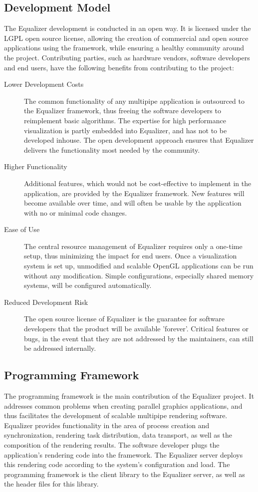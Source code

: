 \documentclass[10pt,a4paper]{scrartcl}
\begin{document}
\subsection{Development Model}

The Equalizer development is conducted in an open way. It is licensed
under the LGPL open source license, allowing the creation of commercial
and open source applications using the framework, while ensuring a
healthy community around the project. Contributing parties, such as
hardware vendors, software developers and end users, have the following
benefits from contributing to the project:

\begin{description}
\item[Lower Development Costs] The common functionality of any multipipe
  application is outsourced to the Equalizer framework, thus freeing the
  software developers to reimplement basic algorithms. The expertise for
  high performance visualization is partly embedded into Equalizer, and
  has not to be developed inhouse. The open development approach ensures
  that Equalizer delivers the functionality most needed by the community.
\item[Higher Functionality] Additional features, which would not be
  cost-effective to implement in the application, are provided by the
  Equalizer framework. New features will become available over time,
  and will often be usable by the application with no or minimal code
  changes.
\item[Ease of Use] The central resource management of Equalizer requires
  only a one-time setup, thus minimizing the impact for end users. Once
  a visualization system is set up, unmodified and scalable OpenGL
  applications can be run without any modification. Simple
  configurations, especially shared memory systems, will be configured
  automatically.
\item[Reduced Development Risk] The open source license of Equalizer is
  the guarantee for software developers that the product will be
  available 'forever'. Critical features or bugs, in the event that they are
  not addressed by the maintainers, can still be addressed internally.
\end{description}

\subsection{Programming Framework}

The programming framework is the main contribution of the
Equalizer project. It addresses common problems when creating parallel
graphics applications, and thus facilitates the development of scalable
multipipe rendering software. Equalizer provides functionality in the
area of process creation and synchronization, rendering task
distribution, data transport, as well as the composition of the
rendering results. The software developer plugs the application's
rendering code into the framework. The Equalizer server deploys this
rendering code according to the system's configuration and load. The
programming framework is the client library to the Equalizer server, as
well as the header files for this library.
\end{document}
